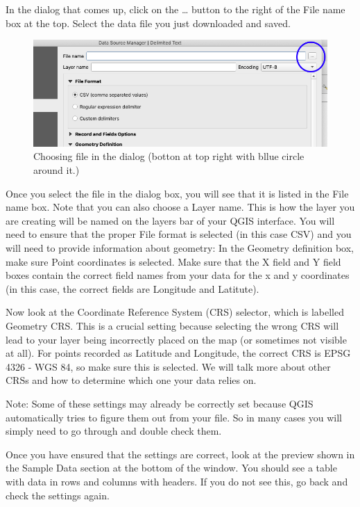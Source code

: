 \documentclass[]{book}
\begin{document}
In the dialog that comes up, click on the \ldots{} button to the right of the File name box at the top. Select the data file you just downloaded and saved.

\begin{figure}
\centering
\includegraphics{images/add_delimited_file_chooser.png}
\caption{Choosing file in the dialog (botton at top right with bllue circle around it.)}
\end{figure}

Once you select the file in the dialog box, you will see that it is listed in the File name box. Note that you can also choose a Layer name. This is how the layer you are creating will be named on the layers bar of your QGIS interface. You will need to ensure that the proper File format is selected (in this case CSV) and you will need to provide information about geometry: In the Geometry definition box, make sure Point coordinates is selected. Make sure that the X field and Y field boxes contain the correct field names from your data for the x and y coordinates (in this case, the correct fields are Longitude and Latitute).

Now look at the Coordinate Reference System (CRS) selector, which is labelled Geometry CRS. This is a crucial setting because selecting the wrong CRS will lead to your layer being incorrectly placed on the map (or sometimes not visible at all). For points recorded as Latitude and Longitude, the correct CRS is EPSG 4326 - WGS 84, so make sure this is selected. We will talk more about other CRSs and how to determine which one your data relies on.

Note: Some of these settings may already be correctly set because QGIS automatically tries to figure them out from your file. So in many cases you will simply need to go through and double check them.

Once you have ensured that the settings are correct, look at the preview shown in the Sample Data section at the bottom of the window. You should see a table with data in rows and columns with headers. If you do not see this, go back and check the settings again.
\end{document}
